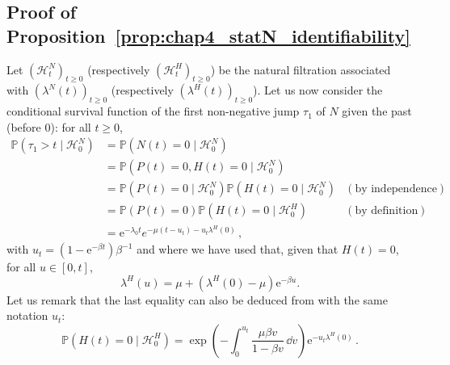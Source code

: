 \begin{subappendices}
\section{Proof of Proposition~\ref{prop:chap4_statN_identifiability}}
\label{app:felix1}

Let $(\mathcal H_t^N)_{t \ge 0}$ (respectively $(\mathcal H_t^H)_{t \ge 0}$) be the natural filtration associated with $(\lambda^N(t))_{t\ge0}$ (respectively $(\lambda^H(t))_{t\ge0}$).
Let us now consider the conditional survival function of the first non-negative jump $\tau_1$ of $N$ given the past (before $0$):
for all $t \ge 0$,
\begin{align*}
  \mathbb P \left(\tau_1 > t \mid \mathcal H_0^N \right)
  &= \mathbb P \left(N(t) = 0 \mid \mathcal H_0^N \right)\\
  &= \mathbb P \left(P(t) = 0, H(t) = 0 \mid \mathcal H_0^N \right)\\
  &= \mathbb P \left(P(t) = 0 \mid \mathcal H_0^N \right) \mathbb P \left( H(t) = 0 \mid \mathcal H_0^N \right) & (\text{by independence})\\
  &= \mathbb P \left(P(t) = 0 \right) \mathbb P \left( H(t) = 0 \mid \mathcal H_0^H \right) & (\text{by definition})\\
  &= \mathrm e^{-\lambda_0 t} e^{- \mu \left( t - u_t \right) - u_t \lambda^H(0)} \,,
\end{align*}
  with $u_t = {(1 - \mathrm e^{-\beta t})}{\beta^{-1}}$ and
where we have used that,
given that $H(t) = 0$,
for all $u \in [0, t]$,
\[
\lambda^H (u) = \mu + \left( \lambda^H(0) - \mu \right) \mathrm e^{-\beta u}.
\]
Let us remark that the last equality can also be deduced from \textcite[Corollary~3.3]{Dassios2011} with the same notation $u_t$:
\[
\mathbb P \left( H(t) = 0 \mid \mathcal H_0^H \right) = \exp \left( - \int_0^{u_t} \frac{\mu\beta v}{1 - \beta v} \, \dd v \right) \mathrm e^{-u_t \lambda^H(0)} \,.
\]


\end{subappendices}
